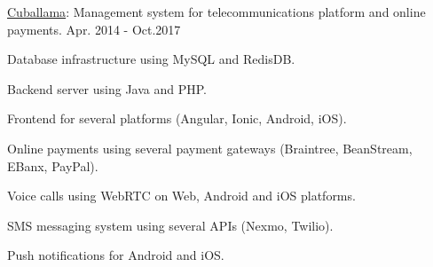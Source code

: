 \begin{cventries}
  \cventry
    {\href{https://www.cuballama.com/}{Cuballama}: Management system for telecommunications platform and online payments.} %
    {} %
    {} %
    {Apr. 2014 - Oct.2017} %
    {
      \begin{cvitems} %
        \item {Database infrastructure using MySQL and RedisDB.}
        \item {Backend server using Java and PHP.}
        \item {Frontend for several platforms (Angular, Ionic, Android, iOS).}
        \item {Online payments using several payment gateways (Braintree, BeanStream, EBanx, PayPal).}
        \item {Voice calls using WebRTC on Web, Android and iOS platforms.}
        \item {SMS messaging system using several APIs (Nexmo, Twilio).}
        \item {Push notifications for Android and iOS.}
      \end{cvitems}
    }

\end{cventries}
